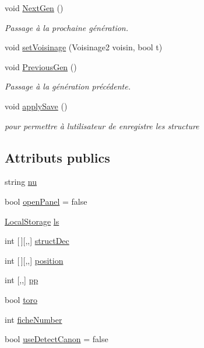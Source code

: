\begin{DoxyCompactItemize}
void \mbox{\hyperlink{class_simulation_a6027638c71846ed03d560cd75d8a92d6}{Next\+Gen}} ()
\begin{DoxyCompactList}\small\item\em Passage à la prochaine génération. \end{DoxyCompactList}\item 
void \mbox{\hyperlink{class_simulation_a9238f4dcd56a4945017fda48a76a3dc8}{set\+Voisinage}} (Voisinage2 voisin, bool t)
\item 
void \mbox{\hyperlink{class_simulation_a2af29808f03940f4a8824c926f8c8cf9}{Previous\+Gen}} ()
\begin{DoxyCompactList}\small\item\em Passage à la génération précédente. \end{DoxyCompactList}\item 
void \mbox{\hyperlink{class_simulation_aee60f7c0cce0789d82fe7a324f1fbffd}{apply\+Save}} ()
\begin{DoxyCompactList}\small\item\em pour permettre à l\textquotesingle{}utilisateur de enregistre les structure \end{DoxyCompactList}\end{DoxyCompactItemize}
\subsection*{Attributs publics}
\begin{DoxyCompactItemize}
\item 
string \mbox{\hyperlink{class_simulation_a2766dce78dbc1f3c20353f02f57103e1}{nu}}
\item 
bool \mbox{\hyperlink{class_simulation_ab4e91933fc69c6696543f44cdc5489eb}{open\+Panel}} = false
\item 
\mbox{\hyperlink{class_local_storage}{Local\+Storage}} \mbox{\hyperlink{class_simulation_a7009e8c0768bac6a8056db7b9614a040}{ls}}
\item 
int \mbox{[}$\,$\mbox{]}\mbox{[},,\mbox{]} \mbox{\hyperlink{class_simulation_ac581af6c4b31a61b95a1c11c1d4ed38b}{struct\+Dec}}
\item 
int \mbox{[}$\,$\mbox{]}\mbox{[},,\mbox{]} \mbox{\hyperlink{class_simulation_a4a4efe47214d16664ea0c43bcc437af3}{position}}
\item 
int \mbox{[},,\mbox{]} \mbox{\hyperlink{class_simulation_a9945c13b481c81bfb75ad26e730a78d4}{pp}}
\item 
bool \mbox{\hyperlink{class_simulation_a0d34073239ee6afd6c15327ae9f249bb}{toro}}
\item 
int \mbox{\hyperlink{class_simulation_a4fd8bb7eb15c0462da5f0615d293e404}{fiche\+Number}}
\item 
bool \mbox{\hyperlink{class_simulation_a2106f84d6bf1aec6e3d852e4a4432217}{use\+Detect\+Canon}} = false
\end{DoxyCompactItemize}


